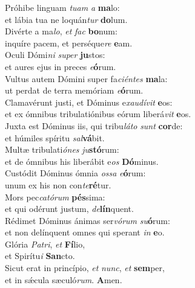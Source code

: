 \oddverse Próhibe linguam \textit{tu}\textit{am} \textit{a} \textbf{ma}lo:~\*\\
\oddverse et lábia tua ne loquán\textit{tur} \textbf{do}lum.\\
\evenverse Divérte a ma\textit{lo}, \textit{et} \textit{fac} \textbf{bo}num:~\*\\
\evenverse inquíre pacem, et perséque\textit{re} \textbf{e}am.\\
\oddverse Oculi Dómi\textit{ni} \textit{su}\textit{per} \textbf{ju}stos:~\*\\
\oddverse et aures ejus in preces \textit{e}\textbf{ó}rum.\\
\evenverse Vultus autem Dómini super fa\textit{ci}\textit{én}\textit{tes} \textbf{ma}la:~\*\\
\evenverse ut perdat de terra memóriam \textit{e}\textbf{ó}rum.\\
\oddverse Clamavérunt justi, et Dóminus e\textit{xau}\textit{dí}\textit{vit} \textbf{e}os:~\*\\
\oddverse et ex ómnibus tribulatiónibus eórum liberá\textit{vit} \textbf{e}os.\\
\evenverse Juxta est Dóminus iis, qui tribu\textit{lá}\textit{to} \textit{sunt} \textbf{cor}de:~\*\\
\evenverse et húmiles spíritu \textit{sal}\textbf{vá}bit.\\
\oddverse Multæ tribulati\textit{ó}\textit{nes} \textit{ju}\textbf{stó}rum:~\*\\
\oddverse et de ómnibus his liberábit e\textit{os} \textbf{Dó}minus.\\
\evenverse Custódit Dóminus ómnia \textit{os}\textit{sa} \textit{e}\textbf{ó}rum:~\*\\
\evenverse unum ex his non con\textit{te}\textbf{ré}tur.\\
\oddverse Mors pec\textit{ca}\textit{tó}\textit{rum} \textbf{pés}sima:~\*\\
\oddverse et qui odérunt justum, \textit{de}\textbf{lín}quent.\\
\evenverse Rédimet Dóminus ánimas ser\textit{vó}\textit{rum} \textit{su}\textbf{ó}rum:~\*\\
\evenverse et non delínquent omnes qui sperant \textit{in} \textbf{e}o.\\
\oddverse Glória \textit{Pa}\textit{tri}, \textit{et} \textbf{Fí}lio,~\*\\
\oddverse et Spirítu\textit{i} \textbf{San}cto.\\
\evenverse Sicut erat in princípio, \textit{et} \textit{nunc}, \textit{et} \textbf{sem}per,~\*\\
\evenverse et in sǽcula sæculó\textit{rum}. \textbf{A}men.\\
